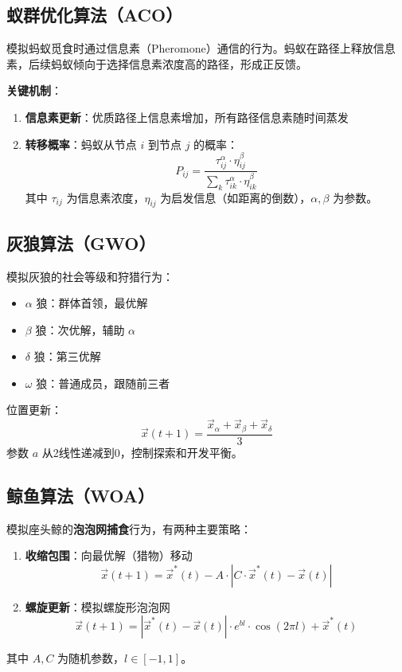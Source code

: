 \subsection{蚁群优化算法（ACO）}

\begin{conceptbox}[ACO原理]
模拟蚂蚁觅食时通过信息素（Pheromone）通信的行为。蚂蚁在路径上释放信息素，后续蚂蚁倾向于选择信息素浓度高的路径，形成正反馈。
\end{conceptbox}

\textbf{关键机制}：
\begin{enumerate}[label=\arabic*.]
    \item \textbf{信息素更新}：优质路径上信息素增加，所有路径信息素随时间蒸发
    \item \textbf{转移概率}：蚂蚁从节点 $i$ 到节点 $j$ 的概率：
    \[
    P_{ij} = \frac{\tau_{ij}^\alpha \cdot \eta_{ij}^\beta}{\sum_k \tau_{ik}^\alpha \cdot \eta_{ik}^\beta}
    \]
    其中 $\tau_{ij}$ 为信息素浓度，$\eta_{ij}$ 为启发信息（如距离的倒数），$\alpha, \beta$ 为参数。
\end{enumerate}

\subsection{灰狼算法（GWO）}

\begin{conceptbox}[GWO原理]
模拟灰狼的社会等级和狩猎行为：
\begin{itemize}[itemsep=0.3em]
    \item $\alpha$ 狼：群体首领，最优解
    \item $\beta$ 狼：次优解，辅助 $\alpha$
    \item $\delta$ 狼：第三优解
    \item $\omega$ 狼：普通成员，跟随前三者
\end{itemize}

位置更新：
\[
\vec{x}(t+1) = \frac{\vec{x}_\alpha + \vec{x}_\beta + \vec{x}_\delta}{3}
\]
参数 $a$ 从2线性递减到0，控制探索和开发平衡。
\end{conceptbox}

\subsection{鲸鱼算法（WOA）}

\begin{conceptbox}[WOA原理]
模拟座头鲸的\textbf{泡泡网捕食}行为，有两种主要策略：
\begin{enumerate}[label=\arabic*.]
    \item \textbf{收缩包围}：向最优解（猎物）移动
    \[
    \vec{x}(t+1) = \vec{x}^*(t) - A \cdot |C \cdot \vec{x}^*(t) - \vec{x}(t)|
    \]
    \item \textbf{螺旋更新}：模拟螺旋形泡泡网
    \[
    \vec{x}(t+1) = |\vec{x}^*(t) - \vec{x}(t)| \cdot e^{bl} \cdot \cos(2\pi l) + \vec{x}^*(t)
    \]
\end{enumerate}
其中 $A, C$ 为随机参数，$l \in [-1, 1]$。
\end{conceptbox}

